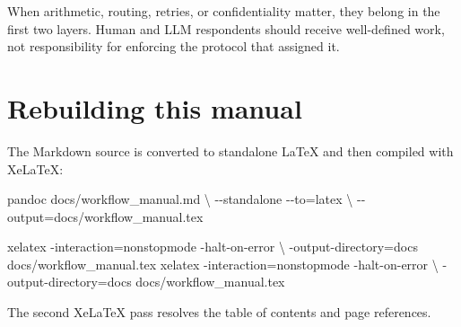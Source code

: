 \documentclass[
  10pt,
]{report}
\newenvironment{Shaded}{}{}
\newcommand{\AttributeTok}[1]{\textcolor[rgb]{0.49,0.56,0.16}{#1}}
\newcommand{\DataTypeTok}[1]{\textcolor[rgb]{0.56,0.13,0.00}{#1}}
\newcommand{\ExtensionTok}[1]{#1}
\newcommand{\NormalTok}[1]{#1}
\newcommand{\OperatorTok}[1]{\textcolor[rgb]{0.40,0.40,0.40}{#1}}
\begin{document}
When arithmetic, routing, retries, or confidentiality matter, they
belong in the first two layers. Human and LLM respondents should receive
well-defined work, not responsibility for enforcing the protocol that
assigned it.

\chapter{Rebuilding this manual}\label{rebuilding-this-manual}

The Markdown source is converted to standalone LaTeX and then compiled
with XeLaTeX:

\begin{Shaded}
\begin{Highlighting}[]
\ExtensionTok{pandoc}\NormalTok{ docs/workflow\_manual.md }\DataTypeTok{\textbackslash{}}
  \AttributeTok{{-}{-}standalone} \AttributeTok{{-}{-}to}\OperatorTok{=}\NormalTok{latex }\DataTypeTok{\textbackslash{}}
  \AttributeTok{{-}{-}output}\OperatorTok{=}\NormalTok{docs/workflow\_manual.tex}

\ExtensionTok{xelatex} \AttributeTok{{-}interaction}\OperatorTok{=}\NormalTok{nonstopmode }\AttributeTok{{-}halt{-}on{-}error} \DataTypeTok{\textbackslash{}}
  \AttributeTok{{-}output{-}directory}\OperatorTok{=}\NormalTok{docs docs/workflow\_manual.tex}
\ExtensionTok{xelatex} \AttributeTok{{-}interaction}\OperatorTok{=}\NormalTok{nonstopmode }\AttributeTok{{-}halt{-}on{-}error} \DataTypeTok{\textbackslash{}}
  \AttributeTok{{-}output{-}directory}\OperatorTok{=}\NormalTok{docs docs/workflow\_manual.tex}
\end{Highlighting}
\end{Shaded}

The second XeLaTeX pass resolves the table of contents and page
references.
\end{document}
